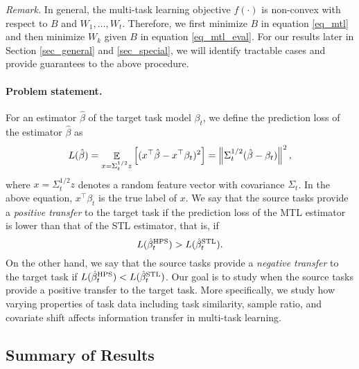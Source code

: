 \smallskip
\noindent\textit{Remark.}
In general, the multi-task learning objective $f(\cdot)$ is non-convex with respect to $B$ and $W_1, \dots, W_t$.
Therefore, we first minimize $B$ in equation \eqref{eq_mtl} and then minimize $W_k$ given $B$ in equation \eqref{eq_mtl_eval}.
For our results later in Section \ref{sec_general} and \ref{sec_special}, we will identify tractable cases and provide guarantees to the above procedure.

\paragraph{Problem statement.}
For an estimator $\hat{\beta}$ of the target task model $\beta_t$, we define the prediction loss of the estimator $\hat{\beta}$ as
	{\begin{align*}
		L(\hat{\beta}) = \mathop{\mathbb{E}}_{x = \Sigma_t^{1/2} z}\left[ ({x}^{\top}\hat{\beta} - {x}^{\top}\beta_t)^2 \right]
		= \left\| \Sigma_t^{1/2} (\hat{\beta} - \beta_t) \right\|^2,
	\end{align*}}%
where $x = \Sigma_t^{1/2} z$ denotes a random feature vector with covariance $\Sigma_t$.
In the above equation, $x^{\top}\beta_t$ is the true label of $x$.
We say that the source tasks provide a \textit{positive transfer} to the target task if the prediction loss of the MTL estimator is lower than that of the STL estimator, that is, if
	\[ L(\hat{\beta}_t^{\textup{HPS}}) > L(\hat{\beta}_t^{\textup{STL}}). \]
On the other hand, we say that the source tasks provide a \textit{negative transfer} to the target task if $L(\hat{\beta}_t^{\textup{HPS}}) < L(\hat{\beta}_t^{\textup{STL}})$.
Our goal is to study when the source tasks provide a positive transfer to the target task.
More specifically, we study how varying properties of task data including task similarity, sample ratio, and covariate shift affects information transfer in multi-task learning.



\subsection{Summary of Results}
\label{sec_prelim}


